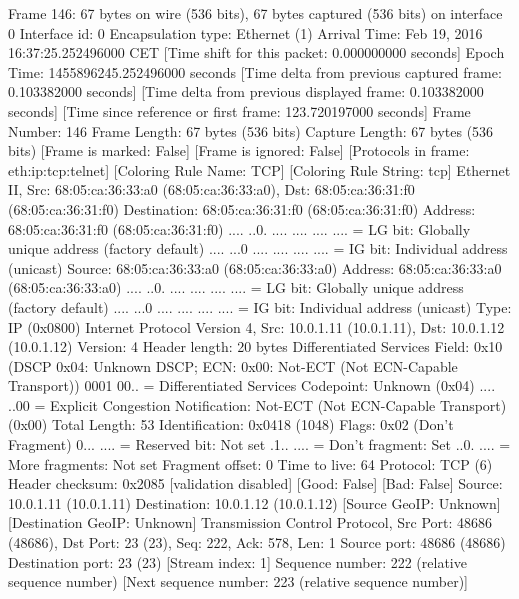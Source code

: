 Frame 146: 67 bytes on wire (536 bits), 67 bytes captured (536 bits) on interface 0
    Interface id: 0
    Encapsulation type: Ethernet (1)
    Arrival Time: Feb 19, 2016 16:37:25.252496000 CET
    [Time shift for this packet: 0.000000000 seconds]
    Epoch Time: 1455896245.252496000 seconds
    [Time delta from previous captured frame: 0.103382000 seconds]
    [Time delta from previous displayed frame: 0.103382000 seconds]
    [Time since reference or first frame: 123.720197000 seconds]
    Frame Number: 146
    Frame Length: 67 bytes (536 bits)
    Capture Length: 67 bytes (536 bits)
    [Frame is marked: False]
    [Frame is ignored: False]
    [Protocols in frame: eth:ip:tcp:telnet]
    [Coloring Rule Name: TCP]
    [Coloring Rule String: tcp]
Ethernet II, Src: 68:05:ca:36:33:a0 (68:05:ca:36:33:a0), Dst: 68:05:ca:36:31:f0 (68:05:ca:36:31:f0)
    Destination: 68:05:ca:36:31:f0 (68:05:ca:36:31:f0)
        Address: 68:05:ca:36:31:f0 (68:05:ca:36:31:f0)
        .... ..0. .... .... .... .... = LG bit: Globally unique address (factory default)
        .... ...0 .... .... .... .... = IG bit: Individual address (unicast)
    Source: 68:05:ca:36:33:a0 (68:05:ca:36:33:a0)
        Address: 68:05:ca:36:33:a0 (68:05:ca:36:33:a0)
        .... ..0. .... .... .... .... = LG bit: Globally unique address (factory default)
        .... ...0 .... .... .... .... = IG bit: Individual address (unicast)
    Type: IP (0x0800)
Internet Protocol Version 4, Src: 10.0.1.11 (10.0.1.11), Dst: 10.0.1.12 (10.0.1.12)
    Version: 4
    Header length: 20 bytes
    Differentiated Services Field: 0x10 (DSCP 0x04: Unknown DSCP; ECN: 0x00: Not-ECT (Not ECN-Capable Transport))
        0001 00.. = Differentiated Services Codepoint: Unknown (0x04)
        .... ..00 = Explicit Congestion Notification: Not-ECT (Not ECN-Capable Transport) (0x00)
    Total Length: 53
    Identification: 0x0418 (1048)
    Flags: 0x02 (Don't Fragment)
        0... .... = Reserved bit: Not set
        .1.. .... = Don't fragment: Set
        ..0. .... = More fragments: Not set
    Fragment offset: 0
    Time to live: 64
    Protocol: TCP (6)
    Header checksum: 0x2085 [validation disabled]
        [Good: False]
        [Bad: False]
    Source: 10.0.1.11 (10.0.1.11)
    Destination: 10.0.1.12 (10.0.1.12)
    [Source GeoIP: Unknown]
    [Destination GeoIP: Unknown]
Transmission Control Protocol, Src Port: 48686 (48686), Dst Port: 23 (23), Seq: 222, Ack: 578, Len: 1
    Source port: 48686 (48686)
    Destination port: 23 (23)
    [Stream index: 1]
    Sequence number: 222    (relative sequence number)
    [Next sequence number: 223    (relative sequence number)]
